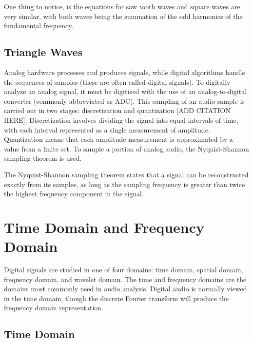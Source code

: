 One thing to notice, is the equations for saw tooth waves and square waves are very similar, with both waves being the summation of the odd harmonics of the fundamental frequency.

\subsection{Triangle Waves}

Analog hardware processes and produces signals, while digital algorithms handle the sequences of samples (these are often called digital signals). To digitally analyze an analog signal, it must be digitized with the use of an analog-to-digital converter (commonly abbreviated as ADC). This sampling of an audio sample is carried out in two stages: discretization and quantization [ADD CITATION HERE]. Discretization involves dividing the signal into equal intervals of time, with each interval represented as a single measurement of amplitude. Quantization means that each amplitude measurement is approximated by a value from a finite set. To sample a portion of analog audio, the Nyquist-Shannon sampling theorem is used. 

The Nyquist-Shannon sampling theorem states that a signal can be reconstructed exactly from its samples, as long as the sampling frequency is greater than twice the highest frequency component in the signal. 

\section{Time Domain and Frequency Domain}

Digital signals are studied in one of four domains: time domain, spatial domain, frequency domain, and wavelet domain. The time and frequency domains are the domains most commonly used in audio analysis. Digital audio is normally viewed in the time domain, though the discrete Fourier transform will produce the frequency domain representation. 

\subsection{Time Domain}


